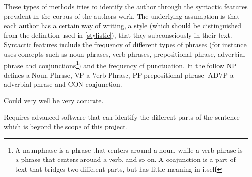 {\label{syntactic}
These types of methods tries to identify the author through the syntactic
features prevalent in the corpus of the authors
work. The underlying assumption is that each author has a certain way of writing, a style (which should be distinguished from the definition used in \ref{stylistic}), that they subconsciously in their text. Syntactic features include the frequency of different types of phrases (for instance \cite{style} uses concepts such as noun phrases, verb phrases, prepositional phrase, adverbial phrase and conjunctions\footnote{A naunphrase is a phrase that centers around a noun, while a verb phrase is a phrase that centers around a verb, and so on. A conjunction is a part of text that bridges two different parts, but has little meaning in itself}) and the frequency of punctuation.
} 
{
In the follow NP defines a Noun Phrase, VP a Verb Phrase, PP prepositional phrase, ADVP a adverbial phrase and CON conjunction.\\
}
{
\item Could very well be very accurate.
}{
\item Requires advanced software that can identify the different parts of the sentence - which is beyond the scope of this project.

}

